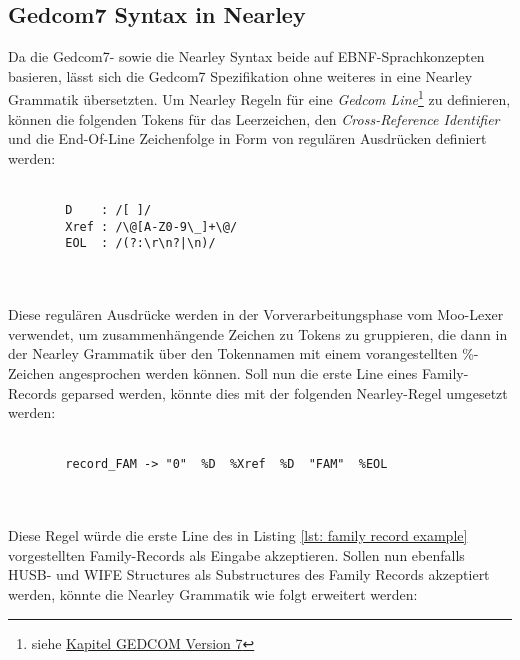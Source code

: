 \subsection{Gedcom7 Syntax in Nearley}
\label{subsec: Gedcom7 Syntax in Nearley}
Da die Gedcom7- sowie die Nearley Syntax beide auf EBNF-Sprachkonzepten basieren, lässt sich die Gedcom7 Spezifikation ohne weiteres in eine Nearley Grammatik übersetzten. Um Nearley Regeln für eine \textit{Gedcom Line}\footnote{siehe \hyperref[sec: GEDCOM Version 7]{Kapitel GEDCOM Version 7}} zu definieren, können die folgenden Tokens für das Leerzeichen, den \textit{Cross-Reference Identifier} und die End-Of-Line Zeichenfolge in Form von regulären Ausdrücken definiert werden:
\\ \\
\begin{minipage}{1.0\textwidth} \small
	\begin{lstlisting}
		D    : /[ ]/
		Xref : /\@[A-Z0-9\_]+\@/	
		EOL  : /(?:\r\n?|\n)/
	\end{lstlisting}
	\label{lst: tokens gedcom line}
\end{minipage}
\\ \\
Diese regulären Ausdrücke werden in der Vorverarbeitungsphase vom Moo-Lexer verwendet, um zusammenhängende Zeichen zu Tokens zu gruppieren, die dann in der Nearley Grammatik über den Tokennamen mit einem vorangestellten \%-Zeichen angesprochen werden können. Soll nun die erste Line eines Family-Records geparsed werden, könnte dies mit der folgenden Nearley-Regel umgesetzt werden:
\\ \\
\begin{minipage}{1.0\textwidth} \small
	\begin{lstlisting}
		record_FAM -> "0"  %D  %Xref  %D  "FAM"  %EOL 
	\end{lstlisting}
	\label{lst: nearley regel family record first line}
\end{minipage}
\\ \\
Diese Regel würde die erste Line des in Listing \ref{lst: family record example} vorgestellten Family-Records als Eingabe akzeptieren. Sollen nun ebenfalls HUSB- und WIFE Structures als Substructures des Family Records akzeptiert werden, könnte die Nearley Grammatik wie folgt erweitert werden:
